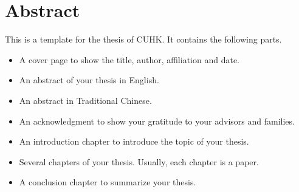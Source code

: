 
\chapter*{Abstract}

This is a template for the thesis of CUHK.
It contains the following parts.
\begin{itemize}
	\item A cover page to show the title, author, affiliation and date.
	\item An abstract of your thesis in English.
	\item An abstract in Traditional Chinese.
	\item An acknowledgment to show your gratitude to your advisors and families.
	\item An introduction chapter to introduce the topic of your thesis.
	\item Several chapters of your thesis. Usually, each chapter is a paper.
	\item A conclusion chapter to summarize your thesis.
\end{itemize}

